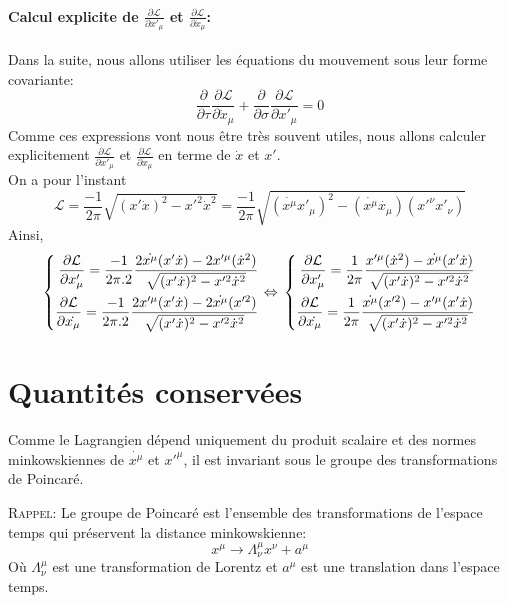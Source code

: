 \documentclass[a4paper,12pt]{article}
\def\xmu{x^\mu}
\def\CL{\mathcal{L}}
\begin{document}
\paragraph{Calcul explicite de $\frac{\partial \CL}{\partial x'_{\mu}}$ et $\frac{\partial \CL}{\partial \dot x_{\mu}}$:}
Dans la suite, nous allons utiliser les équations du mouvement sous leur forme covariante:
$$\frac{\partial}{\partial \tau}\frac{\partial \CL}{\partial \dot x_{\mu}}+\frac{\partial}{\partial \sigma}\frac{\partial \CL}{\partial  x'_{\mu}}=0$$
Comme ces expressions vont nous être très souvent utiles, nous allons calculer explicitement $\frac{\partial \CL}{\partial x'_{\mu}}$ et $\frac{\partial \CL}{\partial \dot x_{\mu}}$ en terme de $\dot{x}$ et $x'$.\\
On a pour l'instant  $$\CL=\frac{-1}{2\pi}\sqrt{(x'\dot{x})^2-x'^2\dot{x}^2}=\frac{-1}{2\pi}\sqrt{(\dot{\xmu}x'_\mu)^2-(\dot{\xmu}\dot{x_\mu})(x'^\nu x'_\nu)}$$
Ainsi,
\begin{equation}
	\left\lbrace 
	\begin{aligned}
	\frac{\partial \CL}{\partial x'_\mu }=\frac{-1}{2\pi.2}\frac{2\dot{\xmu}(x'\dot{x})-2x'^\mu (\dot{x}^2)}{\sqrt{(x'\dot{x})^2-x'^2\dot{x}^2}}\\
	\frac{\partial \CL}{\partial \dot{x_\mu}}=\frac{-1}{2\pi.2}\frac{2x'^\mu(x'\dot{x})-2\dot{\xmu} (x'^2)}{\sqrt{(x'\dot{x})^2-x'^2\dot{x}^2}}\\
	\end{aligned} 
	\right. 
	\Leftrightarrow\\
	\left\lbrace
	\begin{aligned}
	\frac{\partial \CL}{\partial x'_\mu }=\frac{1}{2\pi}\frac{x'^\mu (\dot{x}^2)-\dot{\xmu}(x'\dot{x})}{\sqrt{(x'\dot{x})^2-x'^2\dot{x}^2}}\\
	\frac{\partial \CL}{\partial \dot{x_\mu}}=\frac{1}{2\pi}\frac{\dot{\xmu} (x'^2)-x'^\mu(x'\dot{x})}{\sqrt{(x'\dot{x})^2-x'^2\dot{x}^2}}\\
	\end{aligned}
	\right.\label{mvt}
\end{equation}
\section{Quantités conservées}
Comme le Lagrangien dépend uniquement du produit scalaire et des normes minkowskiennes de $\dot{x^{\mu}}$ et $x'^{\mu}$, il est invariant sous le groupe des transformations de Poincaré.

\textsc{Rappel}: Le groupe de Poincaré est l'ensemble des transformations de l'espace temps qui préservent la distance minkowskienne:
$$ x^{\mu}\rightarrow\Lambda_{\nu}^{\mu}x^{\nu}+a^{\mu}$$ 
Où $\Lambda_{\nu}^{\mu}$ est une transformation de Lorentz et $a^{\mu}$ est une translation dans l'espace temps.\\
\newpage
\end{document}
